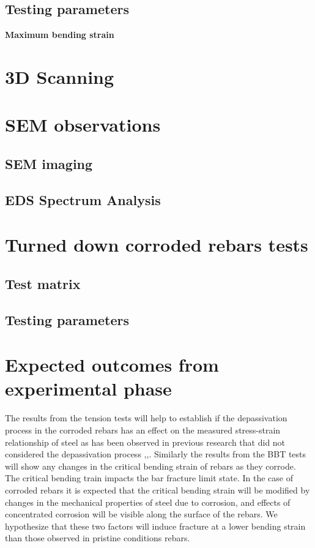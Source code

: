 \subsection{Testing parameters}
\textbf{Maximum bending strain}

\newpage

\section{3D Scanning}
\section{SEM observations}
\subsection{SEM imaging}
\subsection{EDS Spectrum Analysis}
\section{Turned down corroded rebars tests}
\subsection{Test matrix}
\subsection{Testing parameters}

\section{Expected outcomes from experimental phase}

The results from the tension tests will help to establish if the depassivation process in the corroded rebars has an effect on the measured stress-strain relationship of steel as has been observed in previous research that did not considered the depassivation process \cite{Meda2014},\cite{Yuan2017a},\cite{Du2005}. Similarly the results from the BBT tests will show any changes in the critical bending strain of rebars as they corrode. The critical bending train impacts the bar fracture limit state. In the case of corroded rebars it is expected that the critical bending strain will be modified by changes in the mechanical properties of steel due to corrosion, and effects of concentrated corrosion will be visible along the surface of the rebars. We hypothesize that these two factors will induce fracture at a lower bending strain than those observed in pristine conditions rebars\cite{Barcley2019}.

